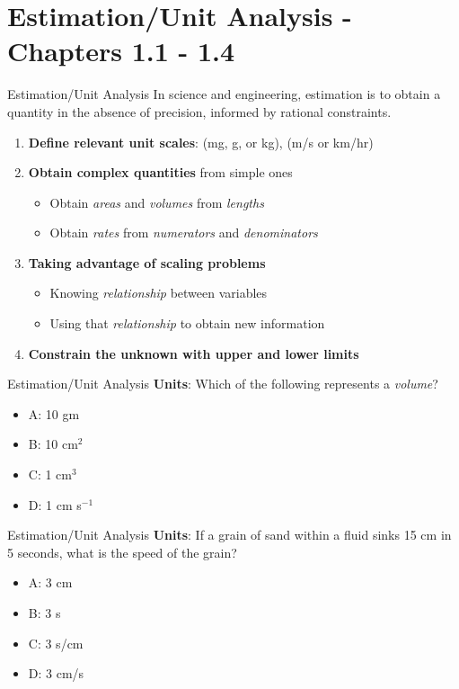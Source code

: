 \documentclass{beamer}
\begin{document}
\section{Estimation/Unit Analysis - Chapters 1.1 - 1.4}

\begin{frame}{Estimation/Unit Analysis}
In science and engineering, \alert{estimation} is to obtain a quantity in the absence of precision, informed by rational constraints.
\begin{enumerate}
\item \textbf{Define relevant \alert{unit scales}}: (mg, g, or kg), (m/s or km/hr)
\item \textbf{Obtain \alert{complex quantities}} from simple ones
\begin{itemize}
\item Obtain \textit{areas} and \textit{volumes} from \textit{lengths}
\item Obtain \textit{rates} from \textit{numerators} and \textit{denominators}
\end{itemize}
\item \textbf{Taking advantage of \alert{scaling problems}}
\begin{itemize}
\item Knowing \textit{relationship} between variables
\item Using that \textit{relationship} to obtain new information
\end{itemize}
\item \textbf{Constrain the unknown with \alert{upper} and \alert{lower} limits}
\end{enumerate}
\end{frame}

\begin{frame}{Estimation/Unit Analysis}
\textbf{Units}: Which of the following represents a \textit{volume}?
\begin{itemize}
\item A: 10 gm
\item B: 10 cm$^2$
\item C: 1 cm$^3$
\item D: 1 cm s$^{-1}$
\end{itemize}
\end{frame}

\begin{frame}{Estimation/Unit Analysis}
\textbf{Units}: If a grain of sand within a fluid sinks 15 cm in 5 seconds, what is the speed of the grain?
\begin{itemize}
\item A: 3 cm
\item B: 3 s
\item C: 3 s/cm
\item D: 3 cm/s
\end{itemize}
\end{frame}
\end{document}
